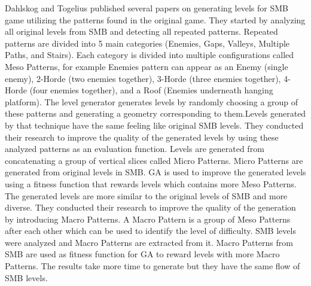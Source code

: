 Dahlskog and Togelius\cite{superMarioPattern1, superMarioPattern2, superMarioPattern3, superMarioPattern4} published several papers on generating levels for SMB game utilizing the patterns found in the original game. They started\cite{superMarioPattern1} by analyzing all original levels from SMB and detecting all repeated patterns. Repeated patterns are divided into 5 main categories (Enemies, Gaps, Valleys, Multiple Paths, and Stairs). Each category is divided into multiple configurations called Meso Patterns, for example Enemies pattern can appear as an Enemy (single enemy), 2-Horde (two enemies together), 3-Horde (three enemies together), 4-Horde (four enemies together), and a Roof (Enemies underneath hanging platform). The level generator generates levels by randomly choosing a group of these patterns and generating a geometry corresponding to them.Levels generated by that technique have the same feeling like original SMB levels. They conducted their research\cite{superMarioPattern2, superMarioPattern3} to improve the quality of the generated levels by using these analyzed patterns as an evaluation function. Levels are generated from concatenating a group of vertical slices called Micro Patterns. Micro Patterns are generated from original levels in SMB. GA is used to improve the generated levels using a fitness function that rewards levels which contains more Meso Patterns. The generated levels are more similar to the original levels of SMB and more diverse. They conducted their research\cite{superMarioPattern4} to improve the quality of the generation by introducing Macro Patterns. A Macro Pattern is a group of Meso Patterns after each other which can be used to identify the level of difficulty. SMB levels were analyzed and Macro Patterns are extracted from it. Macro Patterns from SMB are used as fitness function for GA to reward levels with more Macro Patterns. The results take more time to generate but they have the same flow of SMB levels.\\\par

